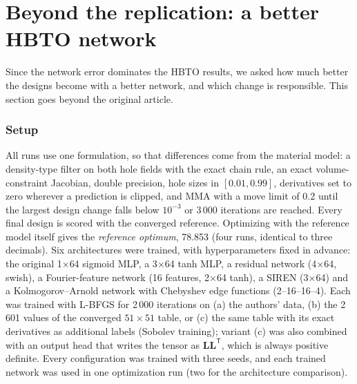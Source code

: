 \FloatBarrier
\section{Beyond the replication: a better HBTO network}\label{sec:extra}
Since the network error dominates the HBTO results, we asked how much better
the designs become with a better network, and which change is responsible.
This section goes beyond the original article.

\subsubsection{Setup} All runs use one formulation, so that differences come from
the material model: a density-type filter on both hole fields with the exact
chain rule, an exact volume-constraint Jacobian, double precision, hole sizes
in $[0.01,0.99]$, derivatives set to zero wherever a prediction is clipped,
and MMA\supercite{Svanberg:1987} with a move limit of 0.2 until the largest
design change falls below $10^{-3}$ or 3\,000 iterations are reached. Every
final design is scored with the converged reference. Optimizing with the
reference model itself gives the \emph{reference optimum}, 78.853 (four runs,
identical to three decimals). Six architectures were trained, with
hyperparameters fixed in advance: the original 1$\times$64 sigmoid MLP, a
3$\times$64 tanh MLP, a residual network (4$\times$64,
swish)\supercite{He:2016}, a Fourier-feature network (16 features, 2$\times$64
tanh)\supercite{Tancik:2020}, a SIREN (3$\times$64)\supercite{Sitzmann:2020}
and a Kolmogorov--Arnold network\supercite{Liu:2025} with Chebyshev edge
functions (2--16--16--4). Each was trained with L-BFGS for 2\,000 iterations on
(a) the authors' data, (b) the 2\,601 values of the converged $51\times51$
table, or (c) the same table with its exact derivatives as additional labels
(Sobolev training\supercite{Czarnecki:2017}); variant (c) was also combined
with an output head that writes the tensor as $\mathbf{L}\mathbf{L}^\mathsf{T}$,
which is always positive definite. Every configuration was trained with three
seeds, and each trained network was used in one optimization run (two for the
architecture comparison).

